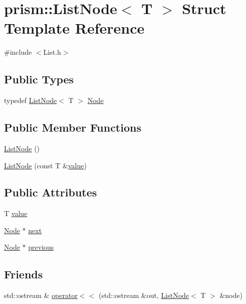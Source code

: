 \hypertarget{structprism_1_1_list_node}{}\section{prism\+:\+:List\+Node$<$ T $>$ Struct Template Reference}
\label{structprism_1_1_list_node}


{\ttfamily \#include $<$List.\+h$>$}

\subsection*{Public Types}
\begin{DoxyCompactItemize}
\item 
typedef \hyperlink{structprism_1_1_list_node}{List\+Node}$<$ T $>$ \hyperlink{structprism_1_1_list_node_a8c91088352214e1e7e347e0db6aaf398}{Node}
\end{DoxyCompactItemize}
\subsection*{Public Member Functions}
\begin{DoxyCompactItemize}
\item 
\hyperlink{structprism_1_1_list_node_ae6a5c202a5ebb4e5155621184b7f44ac}{List\+Node} ()
\item 
\hyperlink{structprism_1_1_list_node_a7c4596468843454cc5f7219e162e7d2a}{List\+Node} (const T \&\hyperlink{structprism_1_1_list_node_a7e32dda6d1af7a226aced3240b4ef42d}{value})
\end{DoxyCompactItemize}
\subsection*{Public Attributes}
\begin{DoxyCompactItemize}
\item 
T \hyperlink{structprism_1_1_list_node_a7e32dda6d1af7a226aced3240b4ef42d}{value}
\item 
\hyperlink{structprism_1_1_list_node_a8c91088352214e1e7e347e0db6aaf398}{Node} $\ast$ \hyperlink{structprism_1_1_list_node_a5ca2fb598c2a27a5fc116c17955c7ddb}{next}
\item 
\hyperlink{structprism_1_1_list_node_a8c91088352214e1e7e347e0db6aaf398}{Node} $\ast$ \hyperlink{structprism_1_1_list_node_a0c9c6c66b2fc2330dc001277902c6c5f}{previous}
\end{DoxyCompactItemize}
\subsection*{Friends}
\begin{DoxyCompactItemize}
\item 
std\+::ostream \& \hyperlink{structprism_1_1_list_node_a729298c247b9f8065872fdb742a1a38c}{operator$<$$<$} (std\+::ostream \&out, \hyperlink{structprism_1_1_list_node}{List\+Node}$<$ T $>$ \&node)
\end{DoxyCompactItemize}


